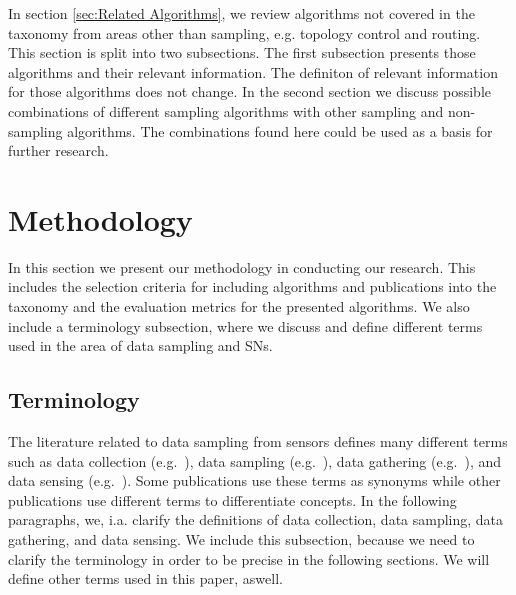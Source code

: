  In section \ref{sec:Related
Algorithms}, we review algorithms not covered in the taxonomy from areas other
than sampling, e.g. topology control and routing. This section is split into
two subsections. The first subsection presents those algorithms and their
relevant information. The definiton of relevant information for those
algorithms does not change. In the second section we discuss possible
combinations of different sampling algorithms with other sampling and
non-sampling algorithms. The combinations found here could be used as a basis
for further research.

\section{Methodology}
\label{sec:Methodology}

In this section we present our methodology in conducting our research. This
includes the selection criteria for including algorithms and publications into
the taxonomy and the evaluation metrics for the presented algorithms. We also
include a terminology subsection, where we discuss and define different terms
used in the area of data sampling and \acp{SN}.

\subsection{Terminology}
\label{sec:Terminology}


The literature related to data sampling from sensors defines many different
terms such as data collection (e.g.~\cite{laiymani2013adaptive, liu2007energy,
wang2012adaptive}), data sampling (e.g.~\cite{willett2004backcasting,
jain2004adaptive, szczytowski2010asample}), data gathering
(e.g.~\cite{wang2012data, luo2009compressive, zhang2016data}), and data sensing
(e.g.~\cite{padhy2006utility, mahmudimanesh2012balanced, duarte2005joint}).
Some publications use these terms as synonyms while other publications use
different terms to differentiate concepts. In the following paragraphs, we,
i.a. clarify the definitions of data collection, data sampling, data gathering,
and data sensing. We include this subsection, because we need to clarify the
terminology in order to be precise in the following sections. We will define
other terms used in this paper, aswell.

